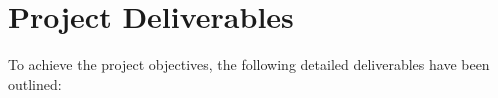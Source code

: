 \documentclass[]{extarticle}
\begin{document}
\section{Project Deliverables}

To achieve the project objectives, the following detailed deliverables have been outlined:
\end{document}
